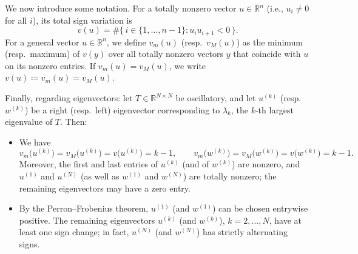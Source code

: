 \documentclass[11pt]{amsart}
\theoremstyle{plain}
\newcommand{\R}{\mathbb{R}}
\newcommand{\1}{\text{\fontseries{bx}\selectfont \textup 1}}
\begin{document}
We now introduce some notation. For a totally nonzero vector $u\in\R^n$ (i.e., $u_i\neq 0$ for all $i$), its total sign variation is
\[
v(u)=\#\{\,i\in\{1,\dots,n-1\}: u_i u_{i+1}<0\,\}.
\]
For a general vector $u\in\R^n$, we define $v_m(u)$ (resp.\ $v_M(u)$) as the minimum (resp.\ maximum) of $v(y)$ over all totally nonzero vectors $y$ that coincide with $u$ on its nonzero entries. If $v_m(u)=v_M(u)$, we write $v(u)\coloneq v_m(u)=v_M(u)$.

Finally, regarding eigenvectors: let $T\in\R^{N\times N}$ be oscillatory, and let $u^{(k)}$ (resp.\ $w^{(k)}$) be a right (resp.\ left) eigenvector corresponding to $\lambda_k$, the $k$-th largest eigenvalue of $T$. Then:
\begin{itemize}
	\item We have
	\[
	v_m\!\big(u^{(k)}\big)=v_M\!\big(u^{(k)}\big)=v\!\big(u^{(k)}\big)=k-1,
	\qquad
	v_m\!\big(w^{(k)}\big)=v_M\!\big(w^{(k)}\big)=v\!\big(w^{(k)}\big)=k-1.
	\]
	Moreover, the first and last entries of $u^{(k)}$ (and of $w^{(k)}$) are nonzero, and $u^{(1)}$ and $u^{(N)}$ (as well as $w^{(1)}$ and $w^{(N)}$) are totally nonzero; the remaining eigenvectors may have a zero entry.
	
	\item By the Perron--Frobenius theorem, $u^{(1)}$ (and $w^{(1)}$) can be chosen entrywise positive. The remaining eigenvectors $u^{(k)}$ (and $w^{(k)}$), $k=2,\dots,N$, have at least one sign change; in fact, $u^{(N)}$ (and $w^{(N)}$) has strictly alternating signs.
\end{itemize}
%
\end{document}
